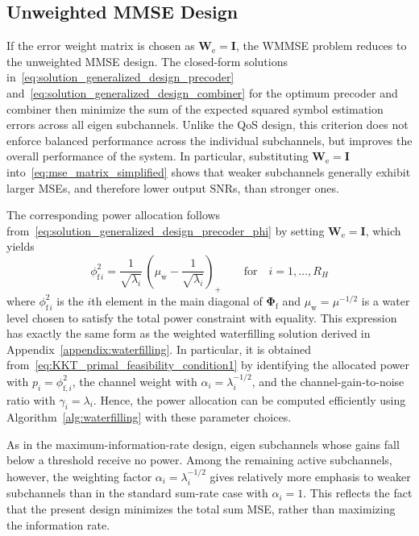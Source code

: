 \subsection{Unweighted MMSE Design}
\label{section:unweighted_mmse_design}
If the error weight matrix is chosen as $\mathbf{W}_{\mathrm{e}} = \mathbf{I}$, the \ac{WMMSE} problem reduces to the unweighted \acf{MMSE} design.
The closed-form solutions in~\eqref{eq:solution_generalized_design_precoder} and~\eqref{eq:solution_generalized_design_combiner} for the optimum precoder and combiner then minimize the sum of the expected squared symbol estimation errors across all eigen subchannels.
Unlike the \ac{QoS} design, this criterion does not enforce balanced performance across the individual subchannels, but improves the overall performance of the system.
In particular, substituting $\mathbf{W}_{\mathrm{e}} = \mathbf{I}$ into~\eqref{eq:mse_matrix_simplified} shows that weaker subchannels generally exhibit larger \acp{MSE}, and therefore lower output \acp{SNR}, than stronger ones.


The corresponding power allocation follows from~\eqref{eq:solution_generalized_design_precoder_phi} by setting $\mathbf{W}_{\mathrm{e}} = \mathbf{I}$, which yields
\begin{equation}
\label{eq:power_allocation_mmse_design}
    \phi_{\mathrm{f} \, i}^2 
    = \frac{1}{\sqrt{\lambda_i}} \, \left(\mu_{\mathrm{w}} - \frac{1}{\sqrt{\lambda_i}}\right)_{+}
    \qquad \text{for} \quad i = 1, \dots, R_H
\end{equation}
where $\phi_{\mathrm{f} \, i}^2$ is the $i$th element in the main diagonal of $\mathbf{\Phi}_{\mathrm{f}}$ and $\mu_{\mathrm{w}} = \mu^{-1/2}$ is a water level chosen to satisfy the total power constraint with equality.
This expression has exactly the same form as the weighted waterfilling solution derived in Appendix~\ref{appendix:waterfilling}. In particular, it is obtained from~\eqref{eq:KKT_primal_feasibility_condition1} by identifying the allocated power with $p_i = \phi_{\mathrm{f},i}^2$, the channel weight with $\alpha_i = \lambda_i^{-1/2}$, and the channel-gain-to-noise ratio with $\gamma_i = \lambda_i$.
Hence, the power allocation can be computed efficiently using Algorithm~\ref{alg:waterfilling} with these parameter choices.

As in the maximum-information-rate design, eigen subchannels whose gains fall below a threshold receive no power. 
Among the remaining active subchannels, however, the weighting factor $\alpha_i = \lambda_i^{-1/2}$ gives relatively more emphasis to weaker subchannels than in the standard sum-rate case with $\alpha_i = 1$.
This reflects the fact that the present design minimizes the total sum \ac{MSE}, rather than maximizing the information rate.


